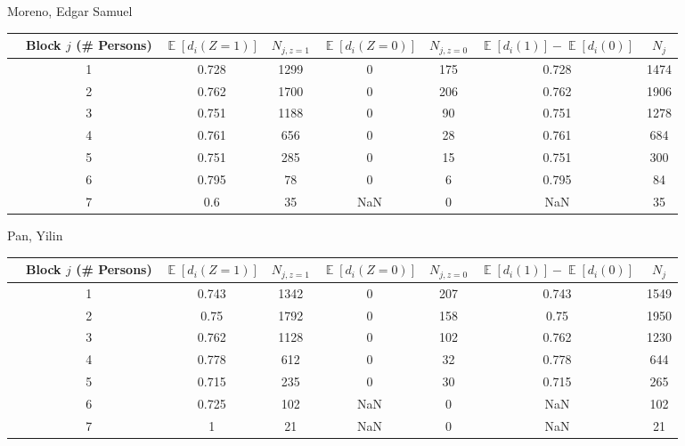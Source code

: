 \documentclass[11pt,notitlepage]{article}
\def\E{\mathop{\mathbb{E}}}
\begin{document}
Moreno, Edgar Samuel
\begin{table}[h!]\small
\begin{center}
\begin{tabular}{rc|cc|cc|cc}
  \hline
 & Block $j$ (\# Persons) & $\E[d_i(Z=1)]$ & $N_{j, z=1}$ & $\E[d_i(Z=0)]$ & $N_{j, z=0}$ & $\E[d_i(1)]-\E[d_i(0)]$ & $N_j$ \\ 
  \hline
  & 1 & 0.728 & 1299 & 0 & 175 & 0.728 & 1474 \\ 
  & 2 & 0.762 & 1700 & 0 & 206 & 0.762 & 1906 \\ 
  & 3 & 0.751 & 1188 & 0 & 90 & 0.751 & 1278 \\ 
  & 4 & 0.761 & 656 & 0 & 28 & 0.761 & 684 \\ 
  & 5 & 0.751 & 285 & 0 & 15 & 0.751 & 300 \\ 
  & 6 & 0.795 & 78 & 0 & 6 & 0.795 & 84 \\ 
  & 7 & 0.6 & 35 & NaN & 0 & NaN & 35 \\ 
   \hline
\end{tabular}
\end{center}
\end{table}


Pan, Yilin
\begin{table}[h!]\small
\begin{center}
\begin{tabular}{rc|cc|cc|cc}
  \hline
 & Block $j$ (\# Persons) & $\E[d_i(Z=1)]$ & $N_{j, z=1}$ & $\E[d_i(Z=0)]$ & $N_{j, z=0}$ & $\E[d_i(1)]-\E[d_i(0)]$ & $N_j$ \\ 
  \hline
 & 1 & 0.743 & 1342 & 0 & 207 & 0.743 & 1549 \\ 
 & 2 & 0.75 & 1792 & 0 & 158 & 0.75 & 1950 \\ 
 & 3 & 0.762 & 1128 & 0 & 102 & 0.762 & 1230 \\ 
 & 4 & 0.778 & 612 & 0 & 32 & 0.778 & 644 \\ 
 & 5 & 0.715 & 235 & 0 & 30 & 0.715 & 265 \\ 
 & 6 & 0.725 & 102 & NaN & 0 & NaN & 102 \\ 
 & 7 & 1 & 21 & NaN & 0 & NaN & 21 \\ 
   \hline
\end{tabular}
\end{center}
\end{table}

\clearpage
\end{document}

